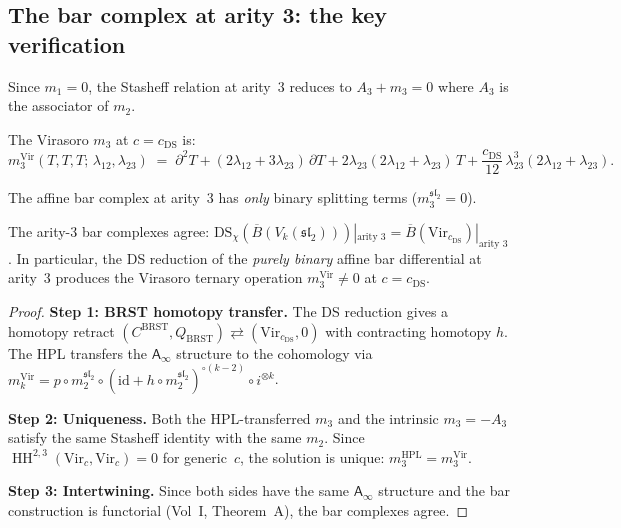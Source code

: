 \documentclass[11pt]{article}
\newcommand{\fsl}{\mathfrak{sl}}
\newcommand{\barB}{\overline{B}}
\newcommand{\Ainf}{\mathsf{A}_{\infty}}
\newcommand{\id}{\mathrm{id}}
\newcommand{\HH}{\operatorname{HH}}
\begin{document}
\subsection{The bar complex at arity 3: the key verification}

Since $m_1 = 0$, the Stasheff relation at arity~$3$ reduces to
$A_3 + m_3 = 0$ where $A_3$ is the associator of $m_2$.

The Virasoro $m_3$ at $c = c_{\mathrm{DS}}$ is:
\begin{equation}\label{eq:wn-vir-m3-ds}
\boxed{
m_3^{\mathrm{Vir}}(T,T,T;\,\lambda_{12},\lambda_{23})
\;=\;
\partial^2 T + (2\lambda_{12} + 3\lambda_{23})\,\partial T
+ 2\lambda_{23}(2\lambda_{12} + \lambda_{23})\,T
+ \frac{c_{\mathrm{DS}}}{12}\,
\lambda_{23}^3(2\lambda_{12} + \lambda_{23}).}
\end{equation}

The affine bar complex at arity~$3$ has \emph{only} binary
splitting terms ($m_3^{\fsl_2} = 0$).

\begin{theorem}%
\label{thm:wn-ds-bar-arity-3}
The arity-$3$ bar complexes agree:
$\mathrm{DS}_\chi(\barB(V_k(\fsl_2)))|_{\text{arity }3}
= \barB(\mathrm{Vir}_{c_{\mathrm{DS}}})|_{\text{arity }3}$.
In particular, the DS reduction of the \emph{purely
binary} affine bar differential at arity~$3$ produces the
Virasoro ternary operation $m_3^{\mathrm{Vir}} \ne 0$
at $c = c_{\mathrm{DS}}$.
\end{theorem}

\begin{proof}
\textbf{Step 1: BRST homotopy transfer.}
The DS reduction gives a homotopy retract
$(C^{\mathrm{BRST}}, Q_{\mathrm{BRST}})
\rightleftarrows (\mathrm{Vir}_{c_{\mathrm{DS}}}, 0)$
with contracting homotopy $h$.  The HPL transfers the
$\Ainf$ structure to the cohomology via
$m_k^{\mathrm{Vir}} = p \circ m_2^{\fsl_2}
\circ (\id + h \circ m_2^{\fsl_2})^{\circ(k-2)}
\circ i^{\otimes k}$.

\medskip
\noindent\textbf{Step 2: Uniqueness.}
Both the HPL-transferred $m_3$ and the intrinsic $m_3 = -A_3$
satisfy the same Stasheff identity with the same $m_2$.
Since $\HH^{2,3}(\mathrm{Vir}_c, \mathrm{Vir}_c) = 0$ for
generic~$c$, the solution is unique:
$m_3^{\mathrm{HPL}} = m_3^{\mathrm{Vir}}$.

\medskip
\noindent\textbf{Step 3: Intertwining.}
Since both sides have the same $\Ainf$ structure and the bar
construction is functorial (Vol~I, Theorem~A), the bar complexes agree.
\end{proof}
\end{document}
